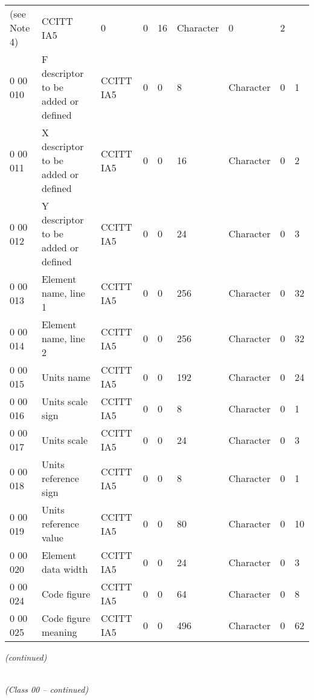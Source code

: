 \begin{longtable}[]{@{}lllllllll@{}}
\begin{minipage}[t]{0.08\columnwidth}
(see Note 4)\strut
\end{minipage} & \begin{minipage}[t]{0.08\columnwidth}\raggedright
CCITT IA5\strut
\end{minipage} & \begin{minipage}[t]{0.08\columnwidth}\raggedright
0\strut
\end{minipage} & \begin{minipage}[t]{0.08\columnwidth}\raggedright
0\strut
\end{minipage} & \begin{minipage}[t]{0.08\columnwidth}\raggedright
16\strut
\end{minipage} & \begin{minipage}[t]{0.08\columnwidth}\raggedright
Character\strut
\end{minipage} & \begin{minipage}[t]{0.08\columnwidth}\raggedright
0\strut
\end{minipage} & \begin{minipage}[t]{0.08\columnwidth}\raggedright
2\strut
\end{minipage}\tabularnewline
0 00 010 & F descriptor to be added or defined & CCITT IA5 & 0 & 0 & 8 & Character & 0 & 1\tabularnewline
0 00 011 & X descriptor to be added or defined & CCITT IA5 & 0 & 0 & 16 & Character & 0 & 2\tabularnewline
0 00 012 & Y descriptor to be added or defined & CCITT IA5 & 0 & 0 & 24 & Character & 0 & 3\tabularnewline
0 00 013 & Element name, line 1 & CCITT IA5 & 0 & 0 & 256 & Character & 0 & 32\tabularnewline
0 00 014 & Element name, line 2 & CCITT IA5 & 0 & 0 & 256 & Character & 0 & 32\tabularnewline
0 00 015 & Units name & CCITT IA5 & 0 & 0 & 192 & Character & 0 & 24\tabularnewline
0 00 016 & Units scale sign & CCITT IA5 & 0 & 0 & 8 & Character & 0 & 1\tabularnewline
0 00 017 & Units scale & CCITT IA5 & 0 & 0 & 24 & Character & 0 & 3\tabularnewline
0 00 018 & Units reference sign & CCITT IA5 & 0 & 0 & 8 & Character & 0 & 1\tabularnewline
0 00 019 & Units reference value & CCITT IA5 & 0 & 0 & 80 & Character & 0 & 10\tabularnewline
0 00 020 & Element data width & CCITT IA5 & 0 & 0 & 24 & Character & 0 & 3\tabularnewline
0 00 024 & Code figure & CCITT IA5 & 0 & 0 & 64 & Character & 0 & 8\tabularnewline
0 00 025 & Code figure meaning & CCITT IA5 & 0 & 0 & 496 & Character & 0 & 62\tabularnewline
\bottomrule
\end{longtable}

\emph{(continued)}

\emph{\\
(Class 00 -- continued)}

